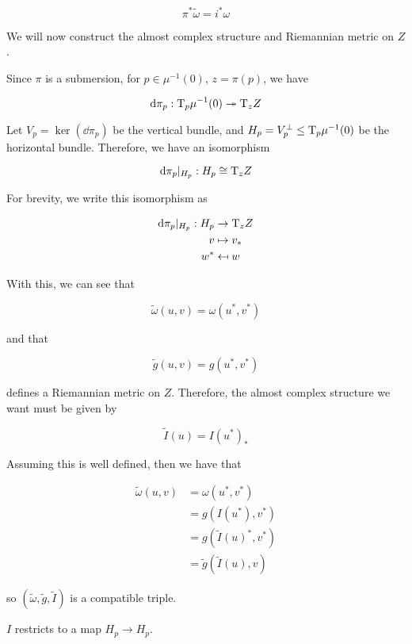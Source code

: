 \documentclass{article}
\renewcommand{\tilde}{\widetilde}
\newcommand{\surj}{\twoheadrightarrow}
\begin{document}
\[\pi^*\tilde\omega = i^*\omega\]

We will now construct the almost complex structure and Riemannian metric on \(Z\).

Since \(\pi\) is a submersion, for \(p \in \mu^{-1}(0)\), \(z = \pi(p)\), we have

\[\dd\pi_p : \TT_p\mu^{-1}(0) \surj \TT_zZ\]

Let \(V_p = \ker(\dd\pi_p)\) be the vertical bundle, and \(H_p = V_p^\perp \le \mathrm{T}_p\mu^{-1}(0)\) be the horizontal bundle. Therefore, we have an isomorphism

\[\dd\pi_p\vert_{H_p} : H_p \cong \mathrm{T}_zZ\]

For brevity, we write this isomorphism as

\begin{align*}
    \dd\pi_p\vert_{H_p} : H_p &\to \mathrm{T}_zZ \\
    v &\mapsto v_* \\
    w^* &\mapsfrom w
\end{align*}

With this, we can see that

\[\tilde\omega(u, v) = \omega(u^*, v^*)\]

and that

\[\tilde g(u, v) = g(u^*, v^*)\]

defines a Riemannian metric on \(Z\). Therefore, the almost complex structure we want must be given by

\[\tilde I(u) = I(u^*)_*\]

Assuming this is well defined, then we have that

\begin{align*}
    \tilde\omega(u, v) &= \omega(u^*, v^*) \\
    &= g(I(u^*), v^*) \\
    &= g(\tilde I(u)^*, v^*) \\
    &= \tilde g(\tilde I(u), v)
\end{align*}

so \((\tilde\omega, \tilde g, \tilde I)\) is a compatible triple.

\begin{lemma*}
    \(I\) restricts to a map \(H_p \to H_p\).
\end{lemma*}
\end{document}
